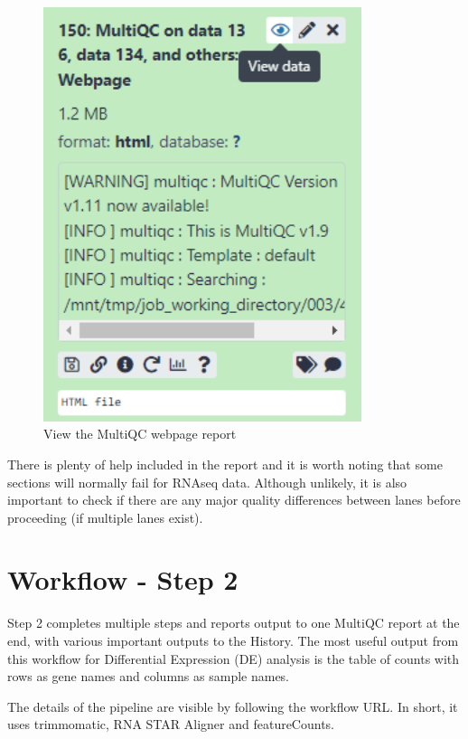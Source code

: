 \documentclass[
]{book}
\begin{document}
\begin{figure}

{\centering \includegraphics[width=3.67in]{images/image_view_multiQC} 

}

\caption{View the MultiQC webpage report}\label{fig:view-multiQC}
\end{figure}

There is plenty of help included in the report and it is worth noting that some sections will normally fail for RNAseq data. Although unlikely, it is also important to check if there are any major quality differences between lanes before proceeding (if multiple lanes exist).

\hypertarget{workflow---step-2}{%
\chapter{Workflow - Step 2}\label{workflow---step-2}}

Step 2 completes multiple steps and reports output to one MultiQC report at the end, with various important outputs to the History.
The most useful output from this workflow for Differential Expression (DE) analysis is the table of counts with rows as gene names and columns as sample names.

The details of the pipeline are visible by following the workflow URL. In short, it uses trimmomatic, RNA STAR Aligner and featureCounts.
\end{document}
